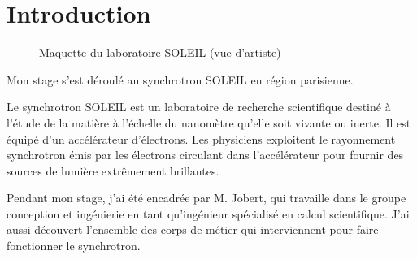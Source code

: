 



			
\chapter*{Introduction}

\begin{figure}
  \centering
  \caption{Maquette du laboratoire SOLEIL (vue d'artiste)}
\end{figure}

     Mon stage s'est déroulé au synchrotron SOLEIL en région parisienne. 



		
     Le synchrotron SOLEIL est un laboratoire de recherche scientifique destiné à l'étude de la matière à l'échelle du nanomètre qu'elle soit vivante ou inerte. Il est équipé d'un accélérateur d'électrons. Les physiciens exploitent le rayonnement synchrotron émis par les électrons circulant dans l'accélérateur pour fournir des sources de lumière extrêmement brillantes.

     Pendant mon stage, j'ai été encadrée par M. Jobert, qui travaille dans le groupe conception et ingénierie en tant qu'ingénieur spécialisé en calcul scientifique. J'ai aussi découvert l'ensemble des corps de métier qui interviennent pour faire fonctionner le synchrotron.
		
